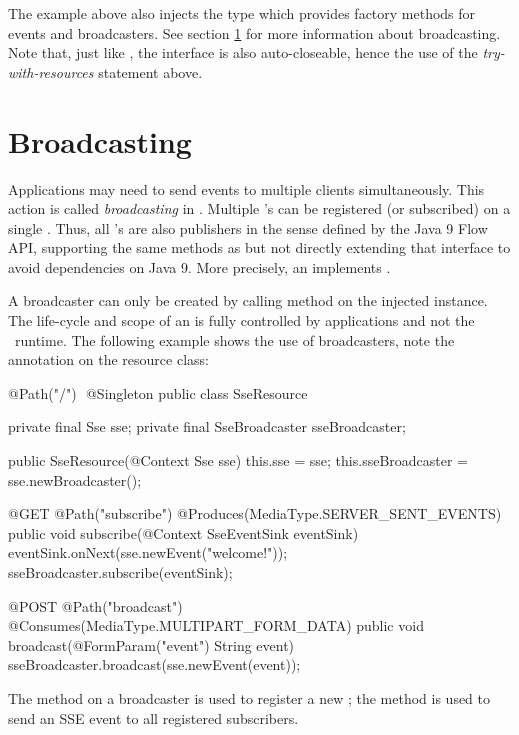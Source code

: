 The example above also injects the  type which provides factory methods for events and broadcasters. See section \ref{sse_broadcasting} for more information about broadcasting. Note that, just like , the interface  is also auto-closeable, hence the use of the \emph{try-with-resources} statement above.

\section{Broadcasting}
\label{sse_broadcasting}

Applications may need to send events to multiple clients simultaneously. This action is called \emph{broadcasting} in \jaxrs. Multiple 's can be registered (or subscribed) on a single . Thus, all 's are also publishers in the sense defined by the Java 9 Flow API, supporting the same methods as  but not directly extending that interface to avoid dependencies on Java 9. More precisely, an  implements .

A broadcaster can only be created by calling method  on the injected  instance. The life-cycle and scope of an  is fully controlled by applications and not the \jaxrs\ runtime. The following example shows the use of broadcasters, note the  annotation on the resource class:

\begin{listing}{1}
@Path("/") 
@Singleton
public class SseResource {
	
  private final Sse sse;
  private final SseBroadcaster sseBroadcaster;
	
  public SseResource(@Context Sse sse) {
    this.sse = sse;
    this.sseBroadcaster = sse.newBroadcaster();
  }  
	
  @GET
  @Path("subscribe")
  @Produces(MediaType.SERVER_SENT_EVENTS)
  public void subscribe(@Context SseEventSink eventSink) {
    eventSink.onNext(sse.newEvent("welcome!"));
    sseBroadcaster.subscribe(eventSink);
  }  
	
  @POST
  @Path("broadcast")
  @Consumes(MediaType.MULTIPART_FORM_DATA)
  public void broadcast(@FormParam("event") String event) { 
    sseBroadcaster.broadcast(sse.newEvent(event));
  } 
}
\end{listing}

The  method on a broadcaster is used to register a new ; the
 method is used to send an SSE event to all registered subscribers.


